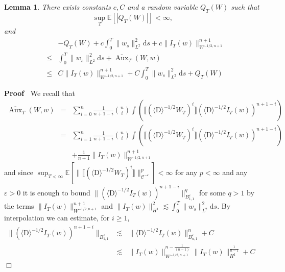 \documentclass[11pt]{article}
\newcommand{\mathD}{\mathrm{D}}
\newcommand{\mathd}{\mathrm{d}}
\newcommand{\tmop}[1]{\ensuremath{\operatorname{#1}}}
\newenvironment{proof}{\noindent\textbf{Proof\ }}{\hspace*{\fill}$\Box$\medskip}
\newtheorem{lemma}{Lemma}
\newcommand{\VV}{\mathscr{C}}
\begin{document}
\begin{lemma}
  \label{lemma:bounds2}There exists constants $c, C$ and a random variable
  $Q_T (W)$ such that
  \[ \sup_T \mathbb{E} [| Q_T (W) |] < \infty, \]
  and
  \begin{eqnarray*}
    &  & - Q_T (W) + c \int^T_0 \| w_s \|_{L^2}^2 \mathd s + c \| I_T (w)
    \|^{n + 1}_{W^{- 1 / 2, n + 1}}\\
    & \leqslant & \int^T_0 \| w_s \|_{L^2}^2 \mathd s +
    \overline{\tmop{Aux}}_T (W, w)\\
    & \leqslant & C \| I_T (w) \|^{n + 1}_{W^{- 1 / 2, n + 1}} + C \int^T_0
    \| w_s \|_{L^2}^2 \mathd s + Q_T (W)
  \end{eqnarray*}
  
\end{lemma}

\begin{proof}
  We recall that
  \begin{eqnarray*}
    \overline{\tmop{Aux}}_T (W, w) & = & \sum_{i = 0}^n \frac{1}{n + 1 - i}
    \binom{n}{i} \int (\llbracket (\langle \mathD \rangle^{- 1 / 2} W_T)^i
    \rrbracket (\langle \mathD \rangle^{- 1 / 2} I_T (w))^{n + 1 - i})\\
    & = & \sum_{i = 1}^n \frac{1}{n + 1 - i} \binom{n}{i} \int (\llbracket
    (\langle \mathD \rangle^{- 1 / 2} W_T)^i \rrbracket (\langle \mathD
    \rangle^{- 1 / 2} I_T (w))^{n + 1 - i})\\
    &  & + \frac{1}{n + 1} \| I_T (w) \|^{n + 1}_{W^{- 1 / 2, n + 1}}
  \end{eqnarray*}
  and since $\sup_{T < \infty} \mathbb{E} \left[ \| \llbracket (\langle \mathD
  \rangle^{- 1 / 2} W_T)^i \rrbracket \|^p_{\VV^{- \varepsilon}} \right] <
  \infty$ for any $p < \infty$ and any $\varepsilon > 0$ it is enough to bound
  $\| (\langle \mathD \rangle^{- 1 / 2} I_T (w))^{n + 1 - i} \|^q_{B_{1,
  1}^{\varepsilon}}$ for some $q > 1$ by the terms $\| I_T (w) \|^{n +
  1}_{W^{- 1 / 2, n + 1}}$ and $\| I_T (w) \|^2_{H^1} \lesssim \int^T_0 \| w_s
  \|_{L^2}^2 \mathd s$. By interpolation we can estimate, for $i \geqslant 1$,
  \[ \begin{array}{lll}
       \| (\langle \mathD \rangle^{- 1 / 2} I_T (w))^{n + 1 - i} \|_{B_{1,
       1}^{\varepsilon}} & \lesssim & \| \langle \mathD \rangle^{- 1 / 2} I_T
       (w) \|^n_{B^{\varepsilon}_{n, 1}} + C\\
       \qquad & \lesssim & \| I_T (w) \|_{W^{- 1 / 2, n + 1}}^{n - \frac{1}{(n
       - 1)}} \| I_T (w) \|^{\frac{1}{n - 1}}_{H^1} + C \qquad \qquad

\end{array}\]
\end{proof}
\end{document}
